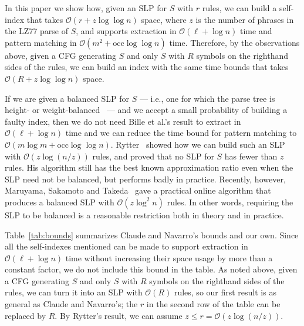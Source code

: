 \documentclass[review]{elsarticle}
\newcommand{\Oh}[1]
    {\ensuremath{\mathcal{O}\!\left( {#1} \right)}}
\newcommand{\occ}
    {\ensuremath{\mathrm{occ}}}
\begin{document}
In this paper we show how, given an SLP for $S$ with $r$ rules, we can build a self-index that takes $\Oh{r + z \log \log n}$ space, where $z$ is the number of phrases in the LZ77 parse of $S$, and supports extraction in $\Oh{\ell + \log n}$ time and pattern matching in $\Oh{m^2 + \occ \log \log n}$ time.  Therefore, by the observations above, given a CFG generating $S$ and only $S$ with $R$ symbols on the righthand sides of the rules, we can build an index with the same time bounds that takes $\Oh{R + z \log \log n}$ space.

If we are given a balanced SLP for $S$ --- i.e., one for which the parse tree is height- or weight-balanced~\cite{CLRS01} --- and we accept a small probability of building a faulty index, then we do not need Bille et al.'s result to extract in $\Oh{\ell + \log n}$ time and we can reduce the time bound for pattern matching to $\Oh{m \log m + \occ \log \log n}$.  Rytter~\cite{Ryt03} showed how we can build such an SLP with $\Oh{z \log (n / z)}$ rules, and proved that no SLP for $S$ has fewer than $z$ rules.  His algorithm still has the best known approximation ratio even when the SLP need not be balanced, but performs badly in practice.  Recently, however, Maruyama, Sakamoto and Takeda~\cite{MST12} gave a practical online algorithm that produces a balanced SLP with $\Oh{z \log^2 n}$ rules.  In other words, requiring the SLP to be balanced is a reasonable restriction both in theory and in practice.

Table~\ref{tab:bounds} summarizes Claude and Navarro's bounds and our own.  Since all the self-indexes mentioned can be made to support extraction in $\Oh{\ell + \log n}$ time without increasing their space usage by more than a constant factor, we do not include this bound in the table.  As noted above, given a CFG generating $S$ and only $S$ with $R$ symbols on the righthand sides of the rules, we can turn it into an SLP with $\Oh{R}$ rules, so our first result is as general as Claude and Navarro's; the $r$ in the second row of the table can be replaced by $R$.  By Rytter's result, we can assume \(z \leq r = \Oh{z \log (n / z)}\).
\end{document}
